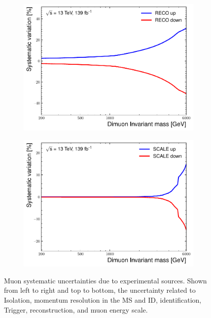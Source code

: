 \begin{figure}[]
\begin{subfigure}[b]{0.42\textwidth}
        \centering
        \includegraphics[width=\textwidth]{figures/analysis/datamc/Uncertainties/exp/mm/m_uu_pstOR_MUON_EFF_RECO_SYS__1up.pdf}
        \label{fig:uncert:mmReco}
    \end{subfigure}
    \begin{subfigure}[b]{0.42\textwidth}
        \centering
        \includegraphics[width=\textwidth]{figures/analysis/datamc/Uncertainties/exp/mm/m_uu_pstOR_MUON_SCALE__1up.pdf}
        \label{fig:uncert:mmScale}
    \end{subfigure}
    \caption[Muon systematic uncertainties due to experimental sources]{Muon systematic uncertainties due to experimental sources. Shown from left to right and top to bottom, the uncertainty related to Isolation, momentum resolution in the MS and ID, identification, Trigger, reconstruction, and muon energy scale.}
    \label{fig:uncert:mmExp}
\end{figure}

